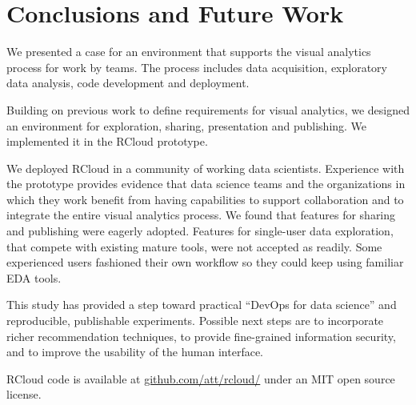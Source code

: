 \section{Conclusions and Future Work}


We presented a case for an environment that supports the
visual analytics process for work by teams. The process
includes data acquisition, exploratory data analysis,
code development and deployment.

Building on previous work to define requirements for
visual analytics, we designed an environment
for exploration, sharing, presentation and publishing.
We implemented it in the RCloud prototype.

We deployed RCloud in a community of working data scientists.
Experience with the prototype provides evidence that data
science teams and the organizations in which they work benefit from
having capabilities to support collaboration and to integrate
the entire visual analytics process. We found that features for
sharing and publishing were eagerly adopted. Features for 
single-user data exploration, that compete with existing mature
tools, were not accepted as readily. Some experienced users
fashioned their own workflow so they could keep using familiar EDA tools.

This study has provided a step toward practical ``DevOps for data science''
and reproducible, publishable experiments.  Possible next steps are
to incorporate richer recommendation techniques, to provide fine-grained
information security, and to improve the usability of the human interface.

RCloud code is available at \url{github.com/att/rcloud/}
under an MIT open source license.
